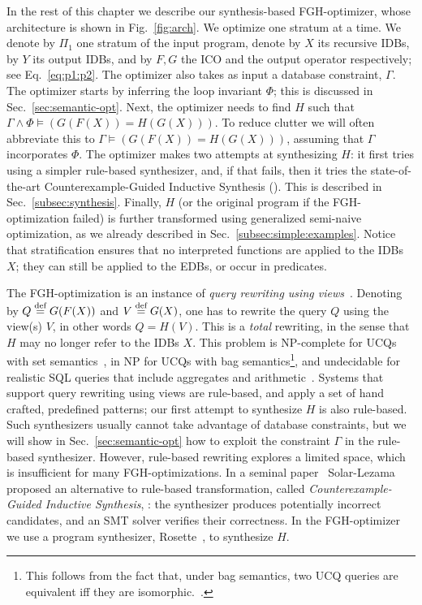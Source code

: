 In the rest of this chapter we describe our synthesis-based
FGH-optimizer, whose architecture is shown in Fig.~\ref{fig:arch}.  We
optimize one stratum at a time.  We denote by $\Pi_1$ one stratum of
the input program, denote by $X$ its recursive IDBs, by $Y$ its output
IDBs, and by $F,G$ the ICO and the output operator respectively; see
Eq.~\eqref{eq:p1:p2}.  The optimizer also takes as input a database
constraint, $\Gamma$.  The optimizer starts by inferring the loop
invariant $\Phi$; this is discussed in Sec.~\ref{sec:semantic-opt}.
Next, the optimizer needs to find $H$ such that
$\Gamma \wedge \Phi \models \left(G(F(X)) = H(G(X))\right)$.  To
reduce clutter we will often abbreviate this to
$\Gamma \models \left(G(F(X)) = H(G(X))\right)$, assuming that
$\Gamma$ incorporates $\Phi$.  The optimizer makes two attempts at
synthesizing $H$: it first tries using a simpler rule-based
synthesizer, and, if that fails, then it tries the state-of-the-art
Counterexample-Guided Inductive Synthesis (\cegis).  This is described
in Sec.~\ref{subsec:synthesis}.  Finally, $H$ (or the original program
if the FGH-optimization failed) is further transformed using
generalized semi-naive optimization, as we already described in
Sec.~\ref{subsec:simple:examples}.  Notice that stratification ensures
that no interpreted functions are applied to the IDBs $X$; they can
still be applied to the EDBs, or occur in predicates.

The FGH-optimization is an instance of {\em query rewriting using
  views}~\cite{DBLP:journals/vldb/Halevy01,DBLP:conf/sigmod/GoldsteinL01}.
Denoting by $Q \stackrel{\text{def}}{=} G(F(X))$ and $V \stackrel{\text{def}}{=} G(X)$, one has to rewrite
the query $Q$ using the view(s) $V$, in other words $Q = H(V)$.  This
is a {\em total} rewriting, in the sense that $H$ may no longer 
refer to the IDBs $X$.  This problem is NP-complete for UCQs with
set semantics~\cite{DBLP:conf/pods/LevyMSS95}, in NP for UCQs with bag
semantics\footnote{This follows from the fact that, under bag semantics, two UCQ queries are
  equivalent iff they are
  isomorphic.~\cite{DBLP:conf/icdt/Green09,DBLP:journals/pvldb/WangHSHL20}.},
and undecidable for realistic SQL queries that include aggregates and
arithmetic~\cite{DBLP:conf/sigmod/GoldsteinL01}.
%
Systems that support query rewriting using views are rule-based, and
apply a set of hand crafted, predefined patterns; our first attempt to
synthesize $H$ is also rule-based.  Such synthesizers usually cannot take advantage
of database constraints, but we will show in
Sec.~\ref{sec:semantic-opt} how to exploit the constraint $\Gamma$ in
the rule-based synthesizer.  However, rule-based rewriting explores a
limited space, which is insufficient for many FGH-optimizations.
In a seminal paper~\cite{DBLP:conf/asplos/Solar-LezamaTBSS06}
Solar{-}Lezama proposed an alternative to rule-based transformation,
called {\em Counterexample-Guided Inductive Synthesis}, \cegis: the
synthesizer produces potentially incorrect candidates, and an SMT
solver verifies their correctness.  In the FGH-optimizer we use a
program synthesizer, Rosette~\cite{DBLP:conf/oopsla/TorlakB13}, to synthesize $H$.

